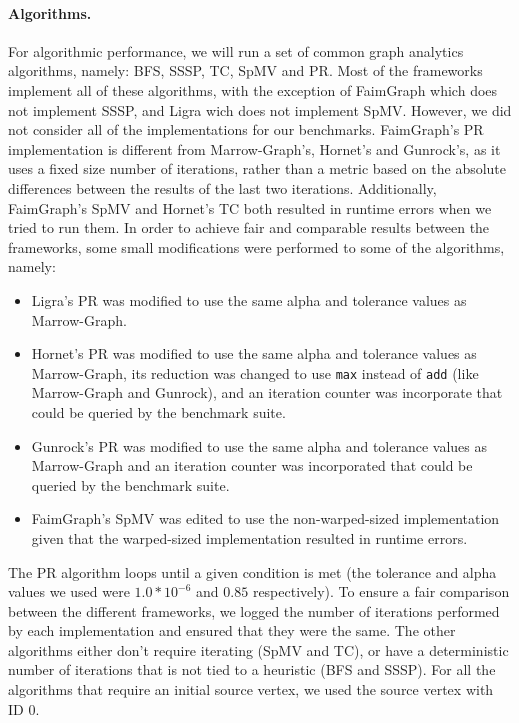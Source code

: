 \paragraph{\textbf{Algorithms}.}
For algorithmic performance, we will run a set of common graph analytics algorithms, namely: \gls{BFS}, \gls{SSSP}, \gls{TC}, \gls{SpMV} and \gls{PR}. Most of the frameworks implement all of these algorithms, with the exception of FaimGraph which does not implement \gls{SSSP}, and Ligra wich does not implement \gls{SpMV}. However, we did not consider all of the implementations for our benchmarks. FaimGraph's \gls{PR} implementation is different from Marrow-Graph's, Hornet's and Gunrock's, as it uses a fixed size number of iterations, rather than a metric based on the absolute differences between the results of the last two iterations. Additionally, FaimGraph's \gls{SpMV} and Hornet's \gls{TC} both resulted in runtime errors when we tried to run them. In order to achieve fair and comparable results between the frameworks, some small modifications were performed to some of the algorithms, namely:
\begin{itemize}
    \item Ligra's \gls{PR} was modified to use the same alpha and tolerance values as Marrow-Graph.
    \item Hornet's \gls{PR} was modified to use the same alpha and tolerance values as Marrow-Graph, its reduction was changed to use \texttt{max} instead of \texttt{add} (like Marrow-Graph and Gunrock), and an iteration counter was incorporate that could be queried by the benchmark suite. %
    \item Gunrock's \gls{PR} was modified to use the same alpha and tolerance values as Marrow-Graph and an iteration counter was incorporated that could be queried by the benchmark suite.
    \item FaimGraph's \gls{SpMV} was edited to use the non-warped-sized implementation given that the warped-sized implementation resulted in runtime errors.
\end{itemize}

The \gls{PR} algorithm loops until a given condition is met (the tolerance and alpha values we used were $1.0*10^{-6}$ and $0.85$ respectively). To ensure a fair comparison between the different frameworks, we logged the number of iterations performed by each implementation and ensured that they were the same. The other algorithms either don't require iterating (\gls{SpMV} and \gls{TC}), or have a deterministic number of iterations that is not tied to a heuristic (\gls{BFS} and \gls{SSSP}). For all the algorithms that require an initial source vertex, we used the source vertex with ID $0$.

